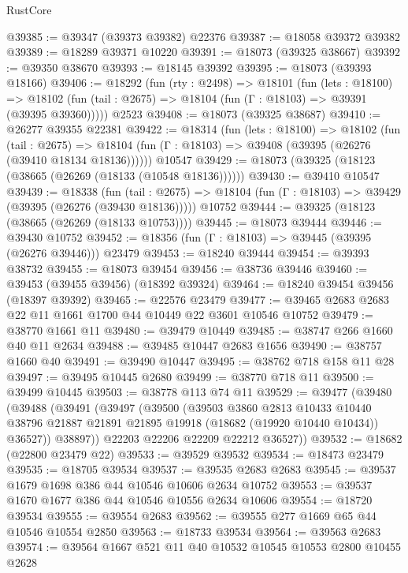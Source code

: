 \begin{lexlean}{RustCore}
\begin{coremodule}
@39385 := @39347 (@39373 @39382) @22376
@39387 := @18058 @39372 @39382
@39389 := @18289 @39371 @10220
@39391 := @18073 (@39325 @38667)
@39392 := @39350 @38670
@39393 := @18145 @39392
@39395 := @18073 (@39393 @18166)
@39406 := @18292
    (fun (rty : @2498) =>
    @18101
      (fun (lets : @18100) =>
      @18102 (fun (tail : @2675) => @18104 (fun (Γ : @18103) => @39391 (@39395 @39360)))))
    @2523
@39408 := @18073 (@39325 @38687)
@39410 := @26277 @39355 @22381
@39422 := @18314
    (fun (lets : @18100) =>
    @18102
      (fun (tail : @2675) =>
      @18104 (fun (Γ : @18103) => @39408 (@39395 (@26276 (@39410 @18134 @18136))))))
    @10547
@39429 := @18073 (@39325 (@18123 (@38665 (@26269 (@18133 (@10548 @18136))))))
@39430 := @39410 @10547
@39439 := @18338
    (fun (tail : @2675) => @18104 (fun (Γ : @18103) => @39429 (@39395 (@26276 (@39430 @18136)))))
    @10752
@39444 := @39325 (@18123 (@38665 (@26269 (@18133 @10753))))
@39445 := @18073 @39444
@39446 := @39430 @10752
@39452 := @18356 (fun (Γ : @18103) => @39445 (@39395 (@26276 @39446))) @23479
@39453 := @18240 @39444
@39454 := @39393 @38732
@39455 := @18073 @39454
@39456 := @38736 @39446
@39460 := @39453 (@39455 @39456) (@18392 @39324)
@39464 := @18240 @39454 @39456 (@18397 @39392)
@39465 := @22576 @23479
@39477 := @39465 @2683 @2683 @22 @11 @1661 @1700 @44 @10449 @22 @3601 @10546 @10752
@39479 := @38770 @1661 @11
@39480 := @39479 @10449
@39485 := @38747 @266 @1660 @40 @11 @2634
@39488 := @39485 @10447 @2683 @1656
@39490 := @38757 @1660 @40
@39491 := @39490 @10447
@39495 := @38762 @718 @158 @11 @28
@39497 := @39495 @10445 @2680
@39499 := @38770 @718 @11
@39500 := @39499 @10445
@39503 := @38778 @113 @74 @11
@39529 := @39477
    (@39480
      (@39488
        (@39491
          (@39497
            (@39500
              (@39503
                @3860
                @2813
                @10433
                @10440
                @38796
                @21887
                @21891
                @21895
                @19918
                (@18682 (@19920 @10440 @10434))
                @36527))
            @38897))
        @22203
        @22206
        @22209
        @22212
        @36527))
@39532 := @18682 (@22800 @23479 @22)
@39533 := @39529 @39532
@39534 := @18473 @23479
@39535 := @18705 @39534
@39537 := @39535 @2683 @2683
@39545 := @39537 @1679 @1698 @386 @44 @10546 @10606 @2634 @10752
@39553 := @39537 @1670 @1677 @386 @44 @10546 @10556 @2634 @10606
@39554 := @18720 @39534
@39555 := @39554 @2683
@39562 := @39555 @277 @1669 @65 @44 @10546 @10554 @2850
@39563 := @18733 @39534
@39564 := @39563 @2683
@39574 := @39564 @1667 @521 @11 @40 @10532 @10545 @10553 @2800 @10455 @2628

\end{coremodule}
\end{lexlean}
